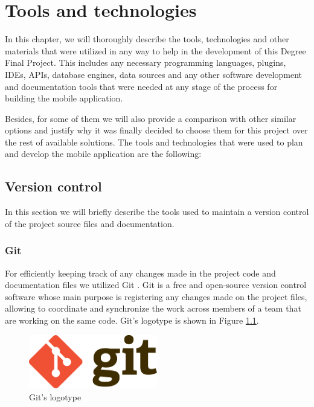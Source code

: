 \chapter{Tools and technologies}
\label{chapter5}

In this chapter, we will thoroughly describe the tools, technologies and other materials that were utilized in any way to help in the development of this Degree Final Project. This includes any necessary programming languages, plugins, IDEs, APIs, database engines, data sources and any other software development and documentation tools that were needed at any stage of the process for building the mobile application.

Besides, for some of them we will also provide a comparison with other similar options and justify why it was finally decided to choose them for this project over the rest of available solutions. The tools and technologies that were used to plan and develop the mobile application are the following:

\section{Version control}

In this section we will briefly describe the tools used to maintain a version control of the project source files and documentation.

\subsection{Git}

For efficiently keeping track of any changes made in the project code and documentation files we utilized Git \cite{noauthor_git_2021}. Git is a free and open-source version control software whose main purpose is registering any changes made on the project files, allowing to coordinate and synchronize the work across members of a team that are working on the same code. Git's logotype is shown in Figure \ref{fig:git}.

\begin{figure}[h]
  \centering
  \includegraphics[width=0.5\textwidth]{Figures/git-logo.png}
  \caption{%
    Git's logotype
  }
  \label{fig:git}
\end{figure}

